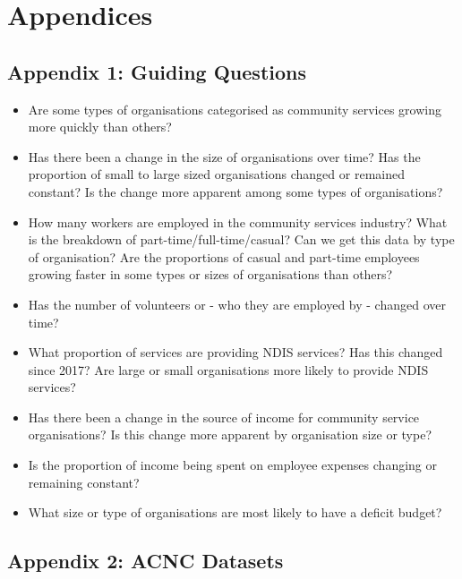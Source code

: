 \documentclass[
  11pt,
]{article}
\providecommand{\tightlist}{%
  \setlength{\itemsep}{0pt}\setlength{\parskip}{0pt}}
\begin{document}
\newpage

\hypertarget{appendices}{%
\section{Appendices}\label{appendices}}

\hypertarget{appendix-1-guiding-questions}{%
\subsection{Appendix 1: Guiding Questions}\label{appendix-1-guiding-questions}}

\begin{itemize}
\tightlist
\item
  Are some types of organisations categorised as community services growing more quickly than others?
\item
  Has there been a change in the size of organisations over time? Has the proportion of small to large sized organisations changed or remained constant? Is the change more apparent among some types of organisations?
\item
  How many workers are employed in the community services industry? What is the breakdown of part-time/full-time/casual? Can we get this data by type of organisation? Are the proportions of casual and part-time employees growing faster in some types or sizes of organisations than others?
\item
  Has the number of volunteers or - who they are employed by - changed over time?
\item
  What proportion of services are providing NDIS services? Has this changed since 2017? Are large or small organisations more likely to provide NDIS services?
\item
  Has there been a change in the source of income for community service organisations? Is this change more apparent by organisation size or type?
\item
  Is the proportion of income being spent on employee expenses changing or remaining constant?
\item
  What size or type of organisations are most likely to have a deficit budget?
\end{itemize}

\newpage

\hypertarget{appendix-2-acnc-datasets}{%
\subsection{Appendix 2: ACNC Datasets}\label{appendix-2-acnc-datasets}}
\end{document}
